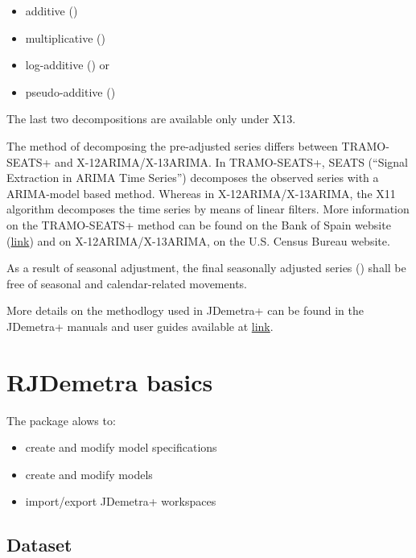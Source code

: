 \documentclass[article]{jss}
\providecommand{\tightlist}{%
  \setlength{\itemsep}{0pt}\setlength{\parskip}{0pt}}
\begin{document}
\begin{itemize}
\tightlist
\item
  additive ()
\item
  multiplicative ()
\item
  log-additive () or
\item
  pseudo-additive ()
\end{itemize}

The last two decompositions are available only under X13.

The method of decomposing the pre-adjusted series differs between
TRAMO-SEATS+ and X-12ARIMA/X-13ARIMA. In TRAMO-SEATS+, SEATS (``Signal
Extraction in ARIMA Time Series'') decomposes the observed series with a
ARIMA-model based method. Whereas in X-12ARIMA/X-13ARIMA, the X11
algorithm decomposes the time series by means of linear filters. More
information on the TRAMO-SEATS+ method can be found on the Bank of Spain
website (\href{www.bde.es}{link}) and on X-12ARIMA/X-13ARIMA, on the
U.S. Census Bureau website.

As a result of seasonal adjustment, the final seasonally adjusted series
() shall be free of seasonal and calendar-related movements.

More details on the methodlogy used in JDemetra+ can be found in the
JDemetra+ manuals and user guides available at
\href{https://ec.europa.eu/eurostat/cros/content/documentation_en}{link}.

\hypertarget{rjdemetra-basics}{%
\section{RJDemetra basics}\label{rjdemetra-basics}}

The  package alows to:

\begin{itemize}
\tightlist
\item
  create and modify model specifications
\item
  create and modify models
\item
  import/export JDemetra+ workspaces
\end{itemize}

\hypertarget{dataset}{%
\subsection{Dataset}\label{dataset}}
\end{document}

